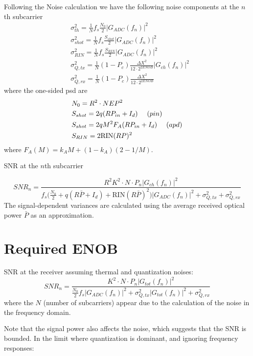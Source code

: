 \documentclass[a4paper]{article}
\begin{document}
Following the Noise calculation we have the following noise components at the $n$th subcarrier
\begin{align}
& \sigma_{th}^2 = \frac{1}{N}f_s\frac{N_0}{2}|G_{ADC}(f_n)|^2 \\
& \sigma_{shot}^2 = \frac{1}{N}f_s\frac{S_{shot}}{2}|G_{ADC}(f_n)|^2 \\
& \sigma_{RIN}^2 = \frac{1}{N}f_s\frac{S_{RIN}}{2}|G_{ADC}(f_n)|^2 \\
& \sigma_{Q, tx}^2 = \frac{1}{N}(1-P_c)\frac{\Delta X^2}{12\cdot 2^{2ENOB}}|G_{ch}(f_n)|^2 \\
& \sigma_{Q, rx}^2 = \frac{1}{N}(1-P_c)\frac{\Delta X^2}{12\cdot 2^{2ENOB}}
\end{align}
where the one-sided psd are
\begin{align}
& N_0 = R^2\cdot NEP^2 \\
& S_{shot} = 2q(RP_{in} + I_d)~~~~\text({\sl pin}) \\
& S_{shot} = 2qM^2F_A(RP_{in} + I_d)~~~~\text({\sl apd}) \\
& S_{RIN} = 2\text{RIN}(RP)^2
\end{align}
where $F_A(M) = k_AM + (1 - k_A)(2 - 1/M)$.

SNR at the $n$th subcarrier

\begin{equation}
SNR_n = \frac{R^2K^2\cdot N\cdot P_n|G_{ch}(f_n)|^2}{f_s\Big(\frac{N_0}{2} + q(R\bar{P} + I_d) + \text{RIN}(R\bar{P})^2\Big)|G_{ADC}(f_n)|^2 + \sigma_{Q, tx}^2 + \sigma_{Q, rx}^2}
\end{equation}
The signal-dependent variances are calculated using the average received optical power $\bar{P}$ as an approximation.

\section{Required ENOB}

SNR at the receiver assuming thermal and quantization noises:
\begin{equation}
SNR_n = \frac{K^2\cdot N\cdot P_n|G_{tot}(f_n)|^2}{\frac{N_0}{2}f_s|G_{ADC}(f_n)|^2 + \sigma_{Q,tx}^2|G_{tot}(f_n)|^2 + \sigma_{Q,rx}^2}
\end{equation}
where the $N$ (number of subcarriers) appear due to the calculation of the noise in the frequency domain. 

Note that the signal power also affects the noise, which suggests that the SNR is bounded. In the limit where quantization is dominant, and ignoring frequency responses:
\end{document}
